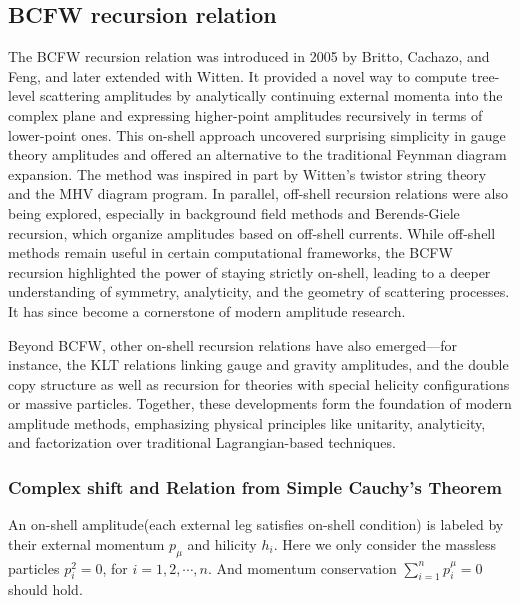 \documentclass[12pt]{article}
\numberwithin{equation}{section}
\begin{document}
\subsection{BCFW recursion relation}
The BCFW recursion relation was introduced in 2005 by Britto, Cachazo, and Feng, and later extended with Witten. It provided a novel way to compute tree-level scattering amplitudes by 
analytically continuing external momenta into the complex plane and expressing higher-point amplitudes recursively in terms of lower-point ones. This on-shell approach uncovered surprising 
simplicity in gauge theory amplitudes and offered an alternative to the traditional Feynman diagram expansion. The method was inspired in part by Witten's twistor string theory and the MHV 
diagram program. In parallel, off-shell recursion relations were also being explored, especially in background field methods and Berends-Giele recursion, which organize amplitudes based on 
off-shell currents. While off-shell methods remain useful in certain computational frameworks, the BCFW recursion highlighted the power of staying strictly on-shell, leading to a deeper understanding 
of symmetry, analyticity, and the geometry of scattering processes. It has since become a cornerstone of modern amplitude research.

Beyond BCFW, other on-shell recursion relations have also emerged—for instance, the KLT relations linking gauge and gravity amplitudes, and the double copy structure as well as recursion 
for theories with special helicity configurations or massive particles. Together, these developments form the foundation of modern amplitude methods, emphasizing physical principles like unitarity, analyticity, 
and factorization over traditional Lagrangian-based techniques.

\subsubsection{Complex shift and Relation from Simple Cauchy's Theorem}
An on-shell amplitude(each external leg satisfies on-shell condition) is labeled by their external momentum $p_\mu$ and hilicity $h_i$.
Here we only consider the massless particles $p_i^2=0$, for $i=1,2,\cdots,n$. And momentum conservation $\sum_{i=1}^{n}p_i^\mu=0$ should hold.
\end{document}
